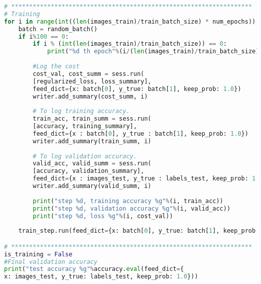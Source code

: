 \begin{lstlisting}[language=Python, label=lst:neuralnet.py, caption={neural\_net.py}, basicstyle=\tiny]
# *******************************************************************
# Training
for i in range(int((len(images_train)/train_batch_size) * num_epochs)):
	batch = random_batch()
	if i%100 == 0:
		if i % (int(len(images_train)/train_batch_size)) == 0:   
			print("%d th epoch"%(i/(len(images_train)/train_batch_size)))
		
		#Log the cost
		cost_val, cost_summ = sess.run(
		[regularized_loss, loss_summary],
		feed_dict={x: batch[0], y_true: batch[1], keep_prob: 1.0})
		writer.add_summary(cost_summ, i)
		
		# To log training accuracy.
		train_acc, train_summ = sess.run(
		[accuracy, training_summary],
		feed_dict={x : batch[0], y_true : batch[1], keep_prob: 1.0})
		writer.add_summary(train_summ, i)
		
		# To log validation accuracy.
		valid_acc, valid_summ = sess.run(
		[accuracy, validation_summary],
		feed_dict={x : images_test, y_true : labels_test, keep_prob: 1.0})
		writer.add_summary(valid_summ, i)
		
		print("step %d, training accuracy %g"%(i, train_acc))
		print("step %d, validation accuracy %g"%(i, valid_acc))
		print("step %d, loss %g"%(i, cost_val))
	
	train_step.run(feed_dict={x: batch[0], y_true: batch[1], keep_prob: drop_out})

# *******************************************************************
is_training = False
#Final validation accuracy
print("test accuracy %g"%accuracy.eval(feed_dict={
x: images_test, y_true: labels_test, keep_prob: 1.0}))
\end{lstlisting}